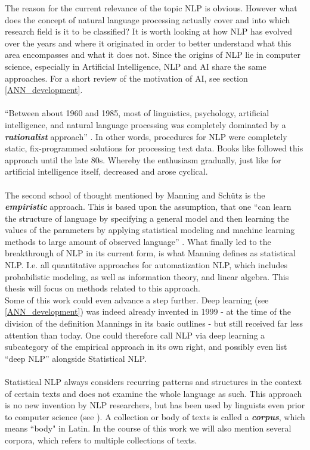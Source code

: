 \documentclass[11pt,a4paper]{article}
\begin{document}
The reason for the current relevance of the topic NLP is obvious. However	 what does the concept of natural language processing actually cover and into which research field is it to be classified? It is worth looking at how NLP has evolved over the years and where it originated in order to better understand what this area encompasses and what it does not. Since the origins of NLP lie in computer science, especially in Artificial Intelligence, NLP and AI share the same approaches. For a short review of the motivation of AI, see section \ref{ANN_development}.  \\
\ \\
“Between about 1960 and 1985, most of linguistics, psychology, artificial intelligence, and natural language processing was completely dominated by a \textbf{\textit{rationalist}} approach” \cite[p. 4]{Manning1999}. In other words, procedures for NLP were completely static, fix-programmed solutions for processing text data. Books like \cite{Noble1988} followed this approach until the late 80s. Whereby the enthusiasm gradually, just like for artificial intelligence itself, decreased and arose cyclical.\\
\ \\
The second school of thought mentioned by Manning and Schütz is the \textit{\textbf{empiristic}} approach.
This is based upon the assumption, that one “can learn the structure of language by specifying a general model and then learning the values of the parameters by applying statistical modeling and machine learning methods to large amount of observed language” \cite[p. 253]{Martinez2010}. What finally led to the breakthrough of NLP in its current form, is what Manning defines as statistical NLP. I.e. all quantitative approaches for automatization NLP, which includes probabilistic modeling, as well as information theory, and linear algebra. This thesis will focus on methods related to this approach.\\
Some of this work could even advance a step further. Deep learning (see \ref{ANN_development}) was indeed already invented in 1999 - at the time of the division of the definition Mannings in its basic outlines - but still received far less attention than today. One could therefore call NLP via deep learning a subcategory of the empirical approach in its own right, and possibly even list ``deep NLP” alongside Statistical NLP.\\
\ \\
Statistical NLP always considers recurring patterns and structures in the context of certain texts and does not examine the whole language as such. This approach is no new invention by NLP researchers, but has been used by linguists even prior to computer science (see \cite{Harris1951}). A collection or body of texts is called a \textbf{\textit{corpus}}, which means ``body" in Latin. In the course of this work we will also mention several corpora, which refers to multiple collections of texts.\\
\end{document}
